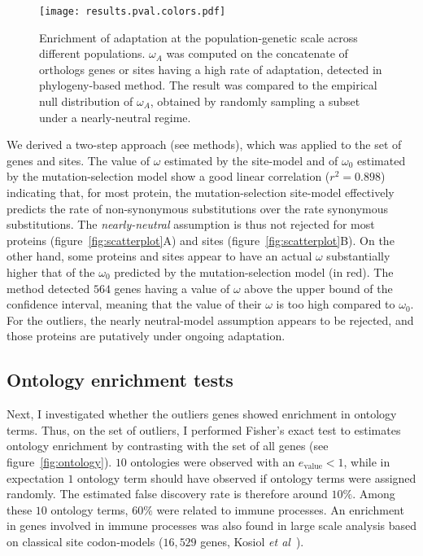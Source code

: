 \documentclass{article}
\begin{document}
\begin{figure*}[h]
	\centering
	\texttt{[image: results.pval.colors.pdf]}
	\label{fig:pvalues}
	\caption{
	Enrichment of adaptation at the population-genetic scale across different populations.
	$\omega_A$ was computed on the concatenate of orthologs genes or sites having a high rate of adaptation, detected in phylogeny-based method.
	The result was compared to the empirical null distribution of $\omega_A$, obtained by randomly sampling a subset under a nearly-neutral regime.
	}
\end{figure*}

We derived a two-step approach (see methods), which was applied to the set of genes and sites.
The value of $\omega$ estimated by the site-model and of $\omega_{0}$ estimated by the mutation-selection model show a good linear correlation ($r^2=0.898$) indicating that, for most protein, the mutation-selection site-model effectively predicts the rate of non-synonymous substitutions over the rate synonymous substitutions.
The \textit{nearly-neutral} assumption is thus not rejected for most proteins (figure~\ref{fig:scatterplot}A) and sites (figure~\ref{fig:scatterplot}B).
On the other hand, some proteins and sites appear to have an actual $\omega$ substantially higher that of the $\omega_0$ predicted by the mutation-selection model (in red).
The method detected $564$ genes having a value of $\omega$ above the upper bound of the confidence interval, meaning that the value of their $\omega$ is too high compared to $\omega_{0}$.
For the outliers, the nearly neutral-model assumption appears to be rejected, and those proteins are putatively under ongoing adaptation.

\subsection*{Ontology enrichment tests}
Next, I investigated whether the outliers genes showed enrichment in ontology terms.
Thus, on the set of outliers, I performed Fisher's exact test to estimates ontology enrichment by contrasting with the set of all genes (see figure~\ref{fig:ontology}).
$10$ ontologies were observed with an $e_{\mathrm{value}} <1$, while in expectation $1$ ontology term should have observed if ontology terms were assigned randomly.
The estimated false discovery rate is therefore around $10 \%$.
Among these $10$ ontology terms, $60 \%$ were related to immune processes.
An enrichment in genes involved in immune processes was also found in large scale analysis based on classical site codon-models ($16,529$ genes, Kosiol \textit{et al}~\citep{kosiol_patterns_2008}).
\end{document}
